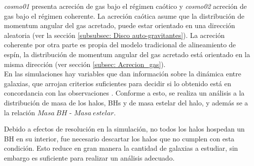 {\it{cosmo01}} presenta acreción de gas bajo el régimen caótico y {\it{cosmo02}} acreción de gas bajo el régimen coherente. La acreción caótica asume que la distribución de momentum angular del gas acretado, puede estar orientado en una dirección aleatoria  
(ver la sección \ref{subsubsec: Disco auto-gravitantes}). La acreción coherente por otra parte es propia del modelo tradicional de alineamiento de espín, la distribución de momentum angular del gas acretado está orientado en la misma dirección
(ver sección \ref{subsec: Acrecion_gas}).
~\\

En las simulaciones hay variables que dan información sobre la dinámica entre galaxias, que arrojan criterios suficientes para decidir si lo obtenido está en concordancia con
las observaciones %
. Conforme a esto, se realiza un análisis a la distribución de masa de los halos, BHs y de masa estelar del halo, y además se a la relación $Masa\ BH$ - $Masa\ estelar$.

Debido a efectos de resolución en la simulación, no todos los halos hospedan un BH en su interior, fue necesario descartar los halos que no cumplen con esta condición. Esto reduce en gran manera la cantidad de galaxias a estudiar, sin embargo es suficiente para realizar un análisis adecuado.

